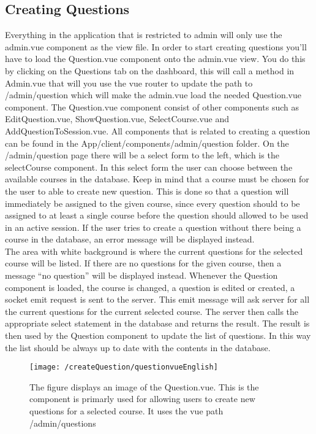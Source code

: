 \subsection{Creating Questions}
Everything in the application that is restricted to admin will only use the admin.vue component as the view file. In order to start creating questions you’ll have to load the Question.vue component onto the admin.vue view. You do this by clicking on the Questions tab on the dashboard, this will call a method in Admin.vue that will you use the vue router to update the path to /admin/question which will make the admin.vue load the needed Question.vue component. The Question.vue component consist of other components such as EditQuestion.vue, ShowQuestion.vue, SelectCourse.vue and AddQuestionToSession.vue. All components that is related to creating a question can be found in the App/client/components/admin/question folder. On the /admin/question page there will be a select form to the left, which is the selectCourse component. In this select form the user can choose between the available courses in the database. Keep in mind that a course must be chosen for the user to able to create new question. This is done so that a question will immediately be assigned to the given course, since every question should to be assigned to at least a single course before the question should allowed to be used in an active session.  If the user tries to create a question without there being a course in the database, an error message will be displayed instead.\\[11pt]
The area with white background is where the current questions for the selected course will be listed. If there are no questions for the given course, then a message “no question” will be displayed instead. Whenever the Question component is loaded, the course is changed, a question is edited or created, a socket emit request is sent to the server. This emit message will ask server for all the current questions for the current selected course. The server then calls the appropriate select statement in the database and returns the result. The result is then used by the Question component to update the list of questions. In this way the list should be always up to date with the contents in the database. 
\begin{figure}[H]
	\centering
	\texttt{[image: /createQuestion/questionvueEnglish]}
	\caption{The figure displays an image of the Question.vue. This is the component is primarly used for allowing users to create new questions for a selected course. It uses the vue path /admin/questions}
	\label{fig:questionVue}
\end{figure}
